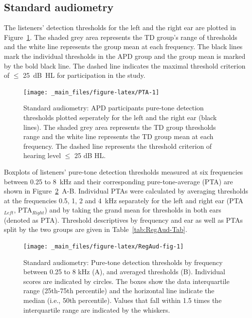 \documentclass[a4paper, twoside]{templates/ociamthesis}
\begin{document}
\hypertarget{standard-audiometry}{%
\subsection{Standard audiometry}\label{standard-audiometry}}

The listeners' detection thresholds for the left and the right ear are plotted in Figure~\ref{fig:PTA}. The shaded grey area represents the TD group's range of thresholds and the white line represents the group mean at each frequency. The black lines mark the individual thresholds in the APD group and the group mean is marked by the bold black line. The dashed line indicates the maximal threshold criterion of \(\leq\) 25~dB~HL for participation in the study.\\

\begin{figure}

{\centering \texttt{[image: \_main\_files/figure-latex/PTA-1]} 

}

\caption{Standard audiometry: APD participants pure-tone detection thresholds plotted seperately for the left and the right ear (black lines). The shaded grey area represents the TD group thresholds range and the white line represents the TD group mean at each frequency. The dashed line represents the threshold criterion of hearing level $\leq$ 25 dB HL.}\label{fig:PTA}
\end{figure}

Boxplots of listeners' pure-tone detection thresholds measured at six frequencies between 0.25 to 8~kHz and their corresponding pure-tone-average (PTA) are shown in Figure~\ref{fig:RegAud-fig}~A-B. Individual PTAs were calculated by averaging thresholds at the frequencies 0.5, 1, 2 and 4~kHz separately for the left and right ear (PTA\(_{Left}\), PTA\(_{Right}\)) and by taking the grand mean for thresholds in both ears (denoted as PTA). Threshold descriptives by frequency and ear as well as PTAs split by the two groups are given in Table~\ref{tab:RegAud-Tab}.\\

\begin{figure}

{\centering \texttt{[image: \_main\_files/figure-latex/RegAud-fig-1]} 

}

\caption{Standard audiometry: Pure-tone detection thresholds by frequency between 0.25 to 8 kHz (A), and averaged thresholds (B). Individual scores are indicated by circles. The boxes show the data interquartile range (25th-75th percentile) and the horizontal line indicate the median (i.e., 50th percentile). Values that fall within 1.5 times the interquartile range are indicated by the whiskers.}\label{fig:RegAud-fig}
\end{figure}
\end{document}
